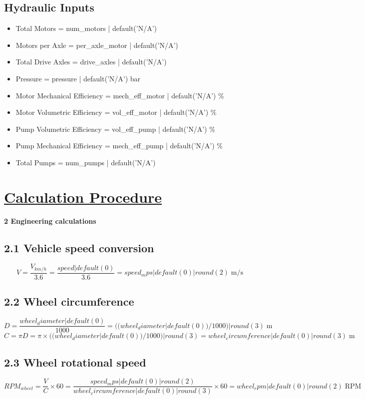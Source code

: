 \documentclass[14pt]{article}
\begin{document}
\subsection*{Hydraulic Inputs}
\begin{itemize}
\item Total Motors = {{ num_motors | default('N/A') }}
\item Motors per Axle = {{ per_axle_motor | default('N/A') }}
\item Total Drive Axles = {{ drive_axles | default('N/A') }}
\item Pressure = {{ pressure | default('N/A') }} bar
\item Motor Mechanical Efficiency = {{ mech_eff_motor | default('N/A') }} \%
\item Motor Volumetric Efficiency = {{ vol_eff_motor | default('N/A') }} \%
\item Pump Volumetric Efficiency = {{ vol_eff_pump | default('N/A') }} \%
\item Pump Mechanical Efficiency = {{ mech_eff_pump | default('N/A') }} \%
\item Total Pumps = {{ num_pumps | default('N/A') }}
\end{itemize}


\section{\underline{Calculation Procedure}}

\noindent\textbf{2 Engineering calculations}
\subsection*{2.1 Vehicle speed conversion}
\[ V = \frac{V_{km/h}}{3.6} = \frac{ {{ speed | default(0) }} }{3.6} = {{ speed_mps | default(0) | round(2) }}\;\mathrm{m/s} \]

\subsection*{2.2 Wheel circumference}
\[ D = \frac{ {{ wheel_diameter | default(0) }} }{1000} = {{ ((wheel_diameter | default(0))/1000) | round(3) }}\;\mathrm{m} \]
\[ C = \pi D = \pi \times {{ ((wheel_diameter | default(0))/1000) | round(3) }} = {{ wheel_circumference | default(0) | round(3) }}\;\mathrm{m} \]

\subsection*{2.3 Wheel rotational speed}
\[ RPM_{wheel} = \frac{V}{C} \times 60 = \frac{ {{ speed_mps | default(0) | round(2) }} }{ {{ wheel_circumference | default(0) | round(3) }} } \times 60 = {{ wheel_rpm | default(0) | round(2) }}\;\mathrm{RPM} \]
\end{document}
